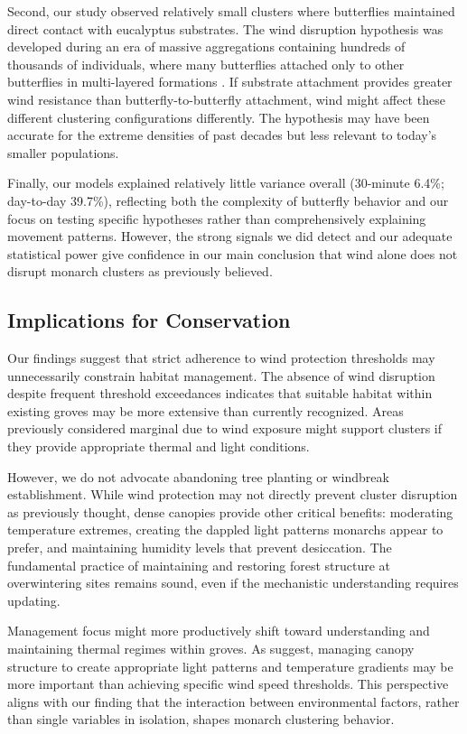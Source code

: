 Second, our study observed relatively small clusters where butterflies maintained direct contact with eucalyptus substrates. The wind disruption hypothesis was developed during an era of massive aggregations containing hundreds of thousands of individuals, where many butterflies attached only to other butterflies in multi-layered formations \parencite{leongMicroenvironmentalFactorsAssociated1990,browerMonarchButterflyClusters2008}. If substrate attachment provides greater wind resistance than butterfly-to-butterfly attachment, wind might affect these different clustering configurations differently. The hypothesis may have been accurate for the extreme densities of past decades but less relevant to today's smaller populations.

Finally, our models explained relatively little variance overall (30-minute 6.4\%; day-to-day 39.7\%), reflecting both the complexity of butterfly behavior and our focus on testing specific hypotheses rather than comprehensively explaining movement patterns. However, the strong signals we did detect and our adequate statistical power give confidence in our main conclusion that wind alone does not disrupt monarch clusters as previously believed.

\subsection{Implications for Conservation}

Our findings suggest that strict adherence to wind protection thresholds may unnecessarily constrain habitat management. The absence of wind disruption despite frequent threshold exceedances indicates that suitable habitat within existing groves may be more extensive than currently recognized. Areas previously considered marginal due to wind exposure might support clusters if they provide appropriate thermal and light conditions.

However, we do not advocate abandoning tree planting or windbreak establishment. While wind protection may not directly prevent cluster disruption as previously thought, dense canopies provide other critical benefits: moderating temperature extremes, creating the dappled light patterns monarchs appear to prefer, and maintaining humidity levels that prevent desiccation. The fundamental practice of maintaining and restoring forest structure at overwintering sites remains sound, even if the mechanistic understanding requires updating.

Management focus might more productively shift toward understanding and maintaining thermal regimes within groves. As \textcite{sanieeHierarchyScaleInfluence2022} suggest, managing canopy structure to create appropriate light patterns and temperature gradients may be more important than achieving specific wind speed thresholds. This perspective aligns with our finding that the interaction between environmental factors, rather than single variables in isolation, shapes monarch clustering behavior.

